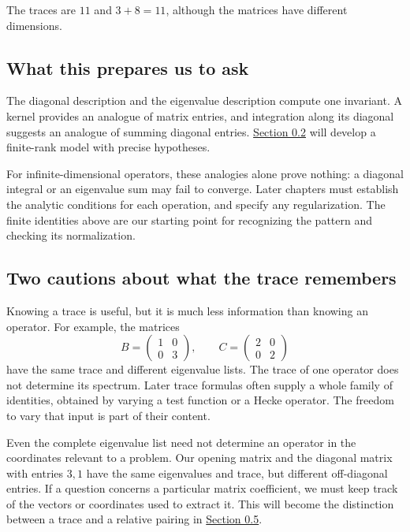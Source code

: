 The traces are \(11\) and \(3+8=11\), although the matrices have different dimensions.

\subsection{What this prepares us to ask}\label{what-this-prepares-us-to-ask}

The diagonal description and the eigenvalue description compute one invariant. A kernel provides an analogue of matrix entries, and integration along its diagonal suggests an analogue of summing diagonal entries. \hyperref[v1a-ch00-s2]{Section 0.2} will develop a finite-rank model with precise hypotheses.

For infinite-dimensional operators, these analogies alone prove nothing: a diagonal integral or an eigenvalue sum may fail to converge. Later chapters must establish the analytic conditions for each operation, and specify any regularization. The finite identities above are our starting point for recognizing the pattern and checking its normalization.


\subsection{Two cautions about what the trace remembers}\label{v1a-ch00-trace-information}

Knowing a trace is useful, but it is much less information than knowing an operator. For example, the matrices
\[
B=\begin{pmatrix}1&0\\0&3\end{pmatrix},
\qquad
C=\begin{pmatrix}2&0\\0&2\end{pmatrix}
\]
have the same trace and different eigenvalue lists. The trace of one operator does not determine its spectrum. Later trace formulas often supply a whole family of identities, obtained by varying a test function or a Hecke operator. The freedom to vary that input is part of their content.

Even the complete eigenvalue list need not determine an operator in the coordinates relevant to a problem. Our opening matrix and the diagonal matrix with entries $3,1$ have the same eigenvalues and trace, but different off-diagonal entries. If a question concerns a particular matrix coefficient, we must keep track of the vectors or coordinates used to extract it. This will become the distinction between a trace and a relative pairing in \hyperref[v1a-ch00-s5]{Section 0.5}.

